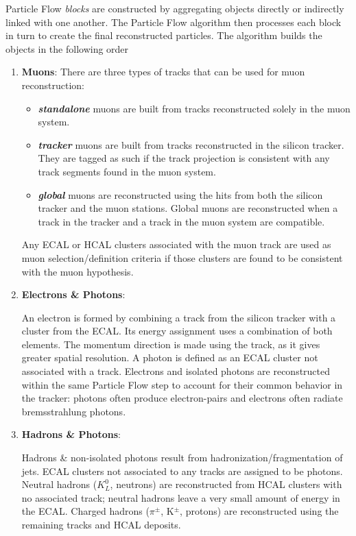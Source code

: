Particle Flow \textit{blocks} are constructed by aggregating objects directly or indirectly linked with one another. The Particle Flow algorithm then processes each block in turn to create the final reconstructed particles. The algorithm builds the objects in the following order

\begin{enumerate}
\item \textbf{Muons}:
There are three types of tracks that can be used for muon reconstruction:
\begin{itemize}
\item
\textit{\textbf{standalone}} muons are built from tracks reconstructed solely in the muon system.
\item
\textit{\textbf{tracker}} muons are built from tracks reconstructed in the silicon tracker. They are tagged as such if the track projection is consistent with any track segments found in the muon system.
\item
\textit{\textbf{global}} muons are reconstructed using the hits from both the silicon tracker and the muon stations. Global muons are reconstructed when a track in the tracker and a track in the muon system are compatible.
\end{itemize}

Any ECAL or HCAL clusters associated with the muon track are used as muon selection/definition criteria if those clusters are found to be consistent with the muon hypothesis.

\item \textbf{Electrons \& Photons}:

An electron is formed by combining a track from the silicon tracker with a cluster from the ECAL. Its energy assignment uses a combination of both elements. The momentum direction is made using the track, as it gives greater spatial resolution.  A photon is defined as an ECAL cluster not associated with a track. Electrons and isolated photons are reconstructed within the same Particle Flow step to account for their common behavior in the tracker: photons often produce electron-pairs and electrons often radiate bremsstrahlung photons.

\item \textbf{Hadrons \& Photons}:

Hadrons \& non-isolated photons result from hadronization/fragmentation of jets. ECAL clusters not associated to any tracks are assigned to be photons. Neutral hadrons ($K^{0}_{L}$, neutrons) are reconstructed from HCAL clusters with no associated track; neutral hadrons leave a very small amount of energy in the ECAL. Charged hadrons ($\pi^{\pm}$, K$^{\pm}$, protons) are reconstructed using the remaining tracks and HCAL deposits.


\end{enumerate}
